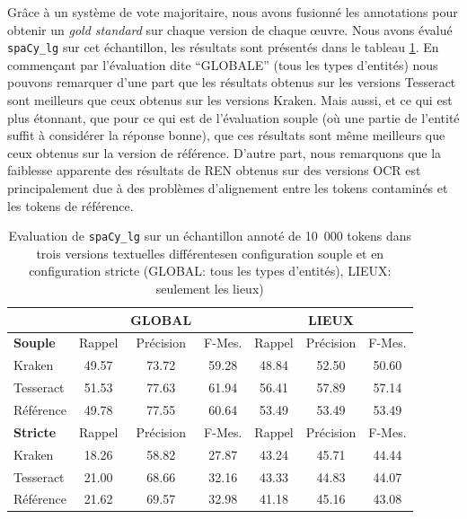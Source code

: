 Grâce à un système de vote majoritaire, nous avons fusionné les annotations pour obtenir un \textit{gold standard} sur chaque version de chaque œuvre.
 Nous avons évalué \texttt{spaCy\_lg} sur cet échantillon, les résultats sont présentés dans le tableau \ref{tab:eval-supervise}.
 En commençant par l'évaluation dite ``GLOBALE'' (tous les types d'entités) nous pouvons remarquer d'une part que les résultats obtenus sur les versions Tesseract sont meilleurs que ceux obtenus sur les versions Kraken. Mais aussi, et ce qui est plus étonnant, que pour ce qui est de l'évaluation souple (où une partie de l'entité suffit à considérer la réponse bonne), que ces résultats sont même meilleurs que ceux obtenus sur la version de référence.
  D'autre part, nous remarquons que la faiblesse apparente des résultats de REN obtenus sur des versions OCR est principalement due à des problèmes d'alignement entre les tokens contaminés et les tokens de référence. 
\begin{table}[h!]
\begin{tabular}{l|ccc|ccc}
 &		&	GLOBAL	&		&		&	LIEUX	&		\\
\hline
 \hline
\textbf{Souple}	&	Rappel		&Précision	&	F-Mes.	&	Rappel&		Précision		&F-Mes.	\\
 \hline
Kraken	&	49.57	&	73.72 	&	59.28	&	48.84	&	52.50	&	50.60	\\
													
Tesseract	&	51.53	&	77.63	&	61.94	&	56.41	&	57.89	&	57.14	\\
													
Référence	&	49.78	&	77.55	&	60.64	&	53.49	&	53.49	&	53.49	\\
\hline
\hline
\textbf{Stricte}	&	Rappel		&Précision	&	F-Mes.	&	Rappel&		Précision		&F-Mes.	 \\
\hline
Kraken	&	18.26	&	58.82	&	27.87	&	43.24	&	45.71	&	44.44	\\
Tesseract	&	21.00	&	68.66	&	32.16	&	43.33	&	44.83	&	44.07	\\
Référence	&	21.62	&	69.57	&	32.98	&	41.18	&	45.16	&	43.08	\\
\hline
\hline
\end{tabular}
\caption{Evaluation de \texttt{spaCy\_lg} sur un échantillon annoté de 10~000 tokens dans trois versions textuelles différentes\label{tab:eval-supervise} en configuration souple et en configuration stricte (GLOBAL: tous les types d'entités), LIEUX: seulement les lieux)}
 \end{table}

